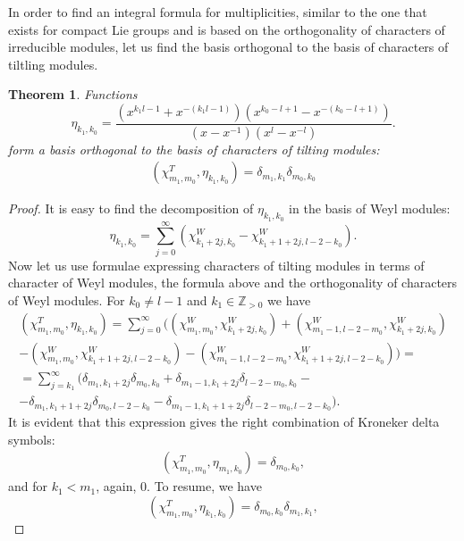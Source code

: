 \documentclass[11pt]{amsart}
\newtheorem{theorem}{Theorem}[section]
\begin{document}
In order to find an integral formula for multiplicities, similar to the one that exists for compact Lie groups and is based on the orthogonality of characters of irreducible modules, let us find the basis orthogonal to the basis of characters of tiltling modules. 
\begin{theorem} Functions 
\begin{equation*}
\eta_{k_1,k_0}=\frac{(x^{k_1l-1}+x^{-(k_1l-1)})(x^{k_0-l+1}-x^{-(k_0-l+1)})}{(x-x^{-1})(x^l-x^{-l})}.
\end{equation*}
form a basis orthogonal to the basis of characters of tilting modules:
\begin{eqnarray*}
	(\chi^T_{m_1,m_0},\eta_{k_1,k_0})=\delta_{m_1,k_1}\delta_{m_0,k_0}
\end{eqnarray*}
\end{theorem}
\begin{proof} 
It is easy to find the decomposition of $\eta_{k_1,k_0}$ in the basis of Weyl modules:
\begin{equation*}
\eta_{k_1,k_0}=\sum_{j=0}^\infty (\chi^W_{k_1+2j,k_0}-\chi^W_{k_1+1+2j,l-2-k_0}).
\end{equation*}
Now let us use formulae expressing characters of tilting modules in terms of character of Weyl modules, the formula above and the orthogonality of characters of Weyl modules.
For $k_0\neq l-1$ and $k_1\in\mathbb{Z}_{>0}$ we have
\begin{eqnarray*}
(\chi^T_{m_1,m_0},\eta_{k_1,k_0})=\sum\limits_{j=0}^\infty((\chi^W_{m_1,m_0},\chi^W_{k_1+2j,k_0})+(\chi^W_{m_1-1,l-2-m_0},\chi^W_{k_1+2j,k_0})\\
-(\chi^W_{m_1,m_0},\chi^W_{k_1+1+2j,l-2-k_0})-(\chi^W_{m_1-1,l-2-m_0},\chi^W_{k_1+1+2j,l-2-k_0}))=\\
=\sum\limits_{j=k_1}^\infty(\delta_{m_1,k_1+2j}\delta_{m_0,k_0}+\delta_{m_1-1,k_1+2j}\delta_{l-2-m_0,k_0}-\\
-\delta_{m_1,k_1+1+2j}\delta_{m_0,l-2-k_0}-\delta_{m_1-1,k_1+1+2j}\delta_{l-2-m_0,l-2-k_0}).
\end{eqnarray*}
It is evident that this expression gives the right combination of Kroneker delta symbols:
\begin{eqnarray*}
	(\chi^T_{m_1,m_0},\eta_{m_1,k_0})=\delta_{m_0,k_0},
\end{eqnarray*}
and for $k_1<m_1$, again, $0$. To resume, we have
\begin{equation*}
	(\chi^T_{m_1,m_0},\eta_{k_1,k_0})=\delta_{m_0,k_0}\delta_{m_1,k_1},
\end{equation*}
\end{proof}
\end{document}
